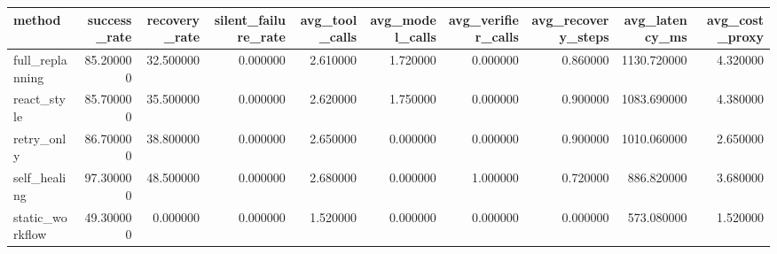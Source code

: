 \begin{tabular}{lrrrrrrrrr}
\toprule
method & success_rate & recovery_rate & silent_failure_rate & avg_tool_calls & avg_model_calls & avg_verifier_calls & avg_recovery_steps & avg_latency_ms & avg_cost_proxy \\
\midrule
full_replanning & 85.200000 & 32.500000 & 0.000000 & 2.610000 & 1.720000 & 0.000000 & 0.860000 & 1130.720000 & 4.320000 \\
react_style & 85.700000 & 35.500000 & 0.000000 & 2.620000 & 1.750000 & 0.000000 & 0.900000 & 1083.690000 & 4.380000 \\
retry_only & 86.700000 & 38.800000 & 0.000000 & 2.650000 & 0.000000 & 0.000000 & 0.900000 & 1010.060000 & 2.650000 \\
self_healing & 97.300000 & 48.500000 & 0.000000 & 2.680000 & 0.000000 & 1.000000 & 0.720000 & 886.820000 & 3.680000 \\
static_workflow & 49.300000 & 0.000000 & 0.000000 & 1.520000 & 0.000000 & 0.000000 & 0.000000 & 573.080000 & 1.520000 \\
\bottomrule
\end{tabular}
